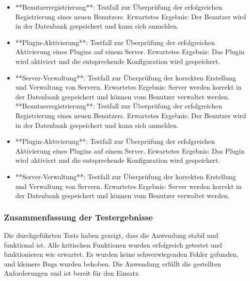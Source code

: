 \begin{itemize}
  \item
        **Benutzerregistrierung**: Testfall zur Überprüfung der erfolgreichen Registrierung eines neuen Benutzers. Erwartetes Ergebnis: Der Benutzer wird in der Datenbank gespeichert und kann sich anmelden.
  \item
        **Plugin-Aktivierung**: Testfall zur Überprüfung der erfolgreichen Aktivierung eines Plugins auf einem Server. Erwartetes Ergebnis: Das Plugin wird aktiviert und die entsprechende Konfiguration wird gespeichert.
  \item
        **Server-Verwaltung**: Testfall zur Überprüfung der korrekten Erstellung und Verwaltung von Servern. Erwartetes Ergebnis: Server werden korrekt in der Datenbank gespeichert und können vom Benutzer verwaltet werden.
        **Benutzerregistrierung**: Testfall zur Überprüfung der erfolgreichen Registrierung eines neuen Benutzers. Erwartetes Ergebnis: Der Benutzer wird in der Datenbank gespeichert und kann sich anmelden.
  \item
        **Plugin-Aktivierung**: Testfall zur Überprüfung der erfolgreichen Aktivierung eines Plugins auf einem Server. Erwartetes Ergebnis: Das Plugin wird aktiviert und die entsprechende Konfiguration wird gespeichert.
  \item
        **Server-Verwaltung**: Testfall zur Überprüfung der korrekten Erstellung und Verwaltung von Servern. Erwartetes Ergebnis: Server werden korrekt in der Datenbank gespeichert und können vom Benutzer verwaltet werden.
\end{itemize}

\subsubsection{Zusammenfassung der Testergebnisse}

Die durchgeführten Tests haben gezeigt, dass die Anwendung stabil und funktional ist. Alle kritischen Funktionen wurden erfolgreich getestet und funktionieren wie erwartet. Es wurden keine schwerwiegenden Fehler gefunden, und kleinere Bugs wurden behoben. Die Anwendung erfüllt die gestellten Anforderungen und ist bereit für den Einsatz.
